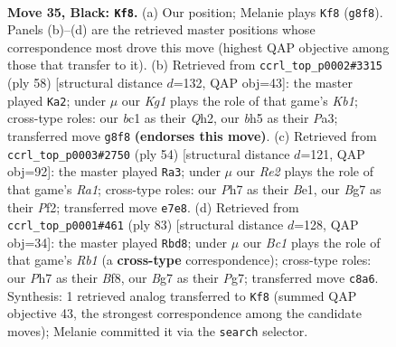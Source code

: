 \documentclass[11pt]{article}
\begin{document}
\clearpage

\begin{figure}[p]\centering
\begin{subfigure}{0.46\textwidth}\centering
\resizebox{\linewidth}{!}{%
\newchessgame
\chessboard[
  setfen={r1b3k1/3pr1bp/1q2p3/p4p1B/P1np3P/5NQ1/1P3PK1/RNBR4 b - - 1 35},
  showmover=false,
  pgfstyle=straightmove, color=movearrow, markmove={g8-f8}
]}
\caption{}
\end{subfigure}\hfill
\begin{subfigure}{0.46\textwidth}\centering
\resizebox{\linewidth}{!}{%
\newchessgame
\chessboard[
  setfen={7r/1kqnr3/1pp1p3/p2p1nPp/N2P1P2/P2RB2R/1PP4Q/1K6 w - - 10 30},
  showmover=false,
  pgfstyle=straightmove, color=movearrow, markmove={b1-a2}
]}
\caption{}
\end{subfigure}
\\[4pt]
\begin{subfigure}{0.46\textwidth}\centering
\resizebox{\linewidth}{!}{%
\newchessgame
\chessboard[
  setfen={4r1k1/pp3rp1/q5n1/P2R1p2/3Pn2P/3NP2Q/5P1P/R3BK2 w - - 1 28},
  showmover=false,
  pgfstyle=straightmove, color=movearrow, markmove={a1-a3}
]}
\caption{}
\end{subfigure}\hfill
\begin{subfigure}{0.46\textwidth}\centering
\resizebox{\linewidth}{!}{%
\newchessgame
\chessboard[
  setfen={1r3bk1/pq3pp1/2n1p2p/2pr4/R7/PPB1PN1P/4QPP1/1R4K1 b - - 38 42},
  showmover=false,
  pgfstyle=straightmove, color=movearrow, markmove={b8-d8}
]}
\caption{}
\end{subfigure}
\caption{\textbf{Move 35, Black: \texttt{Kf8}.} (a) Our position; Melanie plays \texttt{Kf8} (\texttt{g8f8}). Panels (b)--(d) are the retrieved master positions whose correspondence most drove this move (highest QAP objective among those that transfer to it). (b) Retrieved from \texttt{ccrl\_top\_p0002\#3315} (ply 58) [structural distance $d$=132, QAP obj=43]: the master played \texttt{Ka2}; under $\mu$ our \emph{Kg1} plays the role of that game's \emph{Kb1}; cross-type roles: our \emph{b}c1 as their \emph{Q}h2, our \emph{b}h5 as their \emph{P}a3; transferred move \texttt{g8f8} \textbf{(endorses this move)}. (c) Retrieved from \texttt{ccrl\_top\_p0003\#2750} (ply 54) [structural distance $d$=121, QAP obj=92]: the master played \texttt{Ra3}; under $\mu$ our \emph{Re2} plays the role of that game's \emph{Ra1}; cross-type roles: our \emph{P}h7 as their \emph{B}e1, our \emph{B}g7 as their \emph{P}f2; transferred move \texttt{e7e8}. (d) Retrieved from \texttt{ccrl\_top\_p0001\#461} (ply 83) [structural distance $d$=128, QAP obj=34]: the master played \texttt{Rbd8}; under $\mu$ our \emph{Bc1} plays the role of that game's \emph{Rb1} (a \textbf{cross-type} correspondence); cross-type roles: our \emph{P}h7 as their \emph{B}f8, our \emph{B}g7 as their \emph{P}g7; transferred move \texttt{c8a6}. Synthesis: 1 retrieved analog transferred to \texttt{Kf8} (summed QAP objective 43, the strongest correspondence among the candidate moves); Melanie committed it via the \texttt{search} selector.}
\label{fig:thought-m69}
\end{figure}
\end{document}

